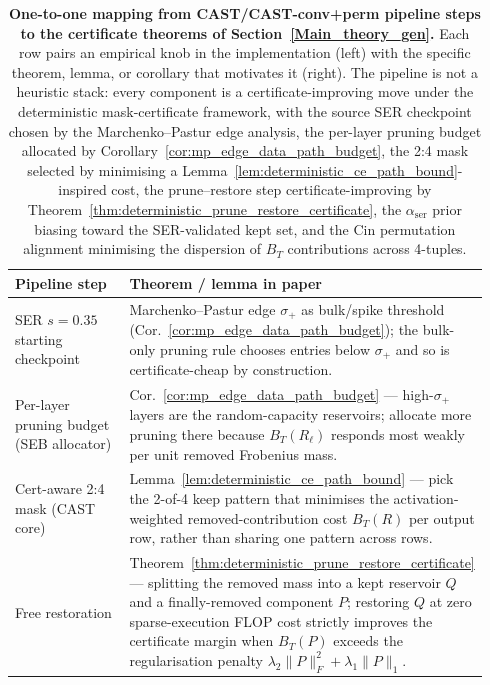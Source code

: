 \documentclass[11pt]{article}
\theoremstyle{plain}
\theoremstyle{definition}
\theoremstyle{remark}
\newcommand{\1}{\mathbf{1}}
\begin{document}
\begin{table}[ht]
\centering
\caption{\textbf{One-to-one mapping from CAST/CAST-conv+perm pipeline steps to the certificate theorems of Section~\ref{Main_theory_gen}.}  Each row pairs an empirical knob in the implementation (left) with the specific theorem, lemma, or corollary that motivates it (right).  The pipeline is not a heuristic stack: every component is a certificate-improving move under the deterministic mask-certificate framework, with the source SER checkpoint chosen by the Marchenko--Pastur edge analysis, the per-layer pruning budget allocated by Corollary~\ref{cor:mp_edge_data_path_budget}, the 2:4 mask selected by minimising a Lemma~\ref{lem:deterministic_ce_path_bound}-inspired cost, the prune--restore step certificate-improving by Theorem~\ref{thm:deterministic_prune_restore_certificate}, the \(\alpha_{\text{ser}}\) prior biasing toward the SER-validated kept set, and the Cin permutation alignment minimising the dispersion of \(B_T\) contributions across 4-tuples.}
\label{tab:cast_theory_map}
\scriptsize
\setlength{\tabcolsep}{4pt}
\begin{tabular}{p{0.32\linewidth}p{0.62\linewidth}}
\toprule
Pipeline step & Theorem / lemma in paper \\
\midrule
SER \(s=0.35\) starting checkpoint
  & Marchenko--Pastur edge \(\sigma_+\) as bulk/spike threshold (Cor.~\ref{cor:mp_edge_data_path_budget}); the bulk-only pruning rule chooses entries below \(\sigma_+\) and so is certificate-cheap by construction. \\
\addlinespace[2pt]
Per-layer pruning budget (SEB allocator)
  & Cor.~\ref{cor:mp_edge_data_path_budget} --- high-\(\sigma_+\) layers are the random-capacity reservoirs; allocate more pruning there because \(B_T(R_\ell)\) responds most weakly per unit removed Frobenius mass. \\
\addlinespace[2pt]
Cert-aware 2:4 mask (CAST core)
  & Lemma~\ref{lem:deterministic_ce_path_bound} --- pick the 2-of-4 keep pattern that minimises the activation-weighted removed-contribution cost \(B_T(R)\) per output row, rather than sharing one pattern across rows. \\
\addlinespace[2pt]
Free restoration
  & Theorem~\ref{thm:deterministic_prune_restore_certificate} --- splitting the removed mass into a kept reservoir \(Q\) and a finally-removed component \(P\); restoring \(Q\) at zero sparse-execution FLOP cost strictly improves the certificate margin when \(B_T(P)\) exceeds the regularisation penalty \(\lambda_2\|P\|_F^2+\lambda_1\|P\|_1\). \\

\end{tabular}
\end{table}
\end{document}
